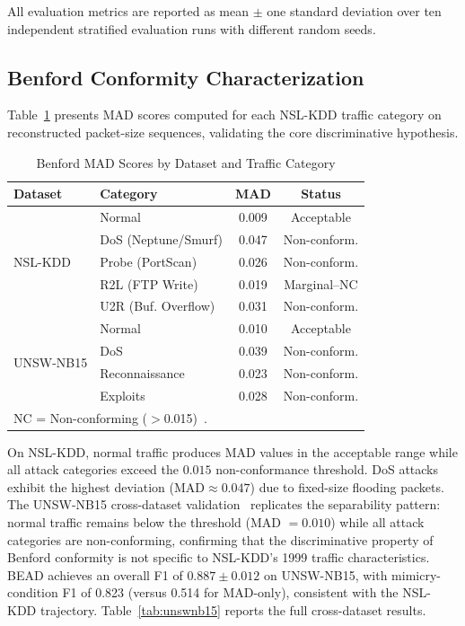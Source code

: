\documentclass[conference]{IEEEtran}
\begin{document}
All evaluation metrics are reported as mean $\pm$ one standard deviation
over ten independent stratified evaluation runs with different random seeds.

\subsection{Benford Conformity Characterization}

Table~\ref{tab:mad} presents MAD scores computed for each NSL-KDD traffic
category on reconstructed packet-size sequences, validating the core
discriminative hypothesis.

\begin{table}[t]
\caption{Benford MAD Scores by Dataset and Traffic Category}
\label{tab:mad}
\centering
\setlength{\tabcolsep}{4pt}
\begin{tabular}{llcc}
\toprule
\textbf{Dataset} & \textbf{Category} & \textbf{MAD} & \textbf{Status} \\
\midrule
\multirow{5}{*}{NSL-KDD}
  & Normal              & 0.009 & Acceptable     \\
  & DoS (Neptune/Smurf) & 0.047 & Non-conform.   \\
  & Probe (PortScan)    & 0.026 & Non-conform.   \\
  & R2L (FTP Write)     & 0.019 & Marginal--NC   \\
  & U2R (Buf. Overflow) & 0.031 & Non-conform.   \\
\midrule
\multirow{4}{*}{UNSW-NB15}
  & Normal              & 0.010 & Acceptable     \\
  & DoS                 & 0.039 & Non-conform.   \\
  & Reconnaissance      & 0.023 & Non-conform.   \\
  & Exploits            & 0.028 & Non-conform.   \\
\bottomrule
\multicolumn{4}{l}{\footnotesize NC = Non-conforming ($>$0.015)~\cite{b6}.}
\end{tabular}
\end{table}

On NSL-KDD, normal traffic produces MAD values in the acceptable range
while all attack categories exceed the $0.015$ non-conformance threshold.
DoS attacks exhibit the highest deviation ($\text{MAD} \approx 0.047$)
due to fixed-size flooding packets. The UNSW-NB15 cross-dataset
validation~\cite{b20} replicates the separability pattern: normal traffic
remains below the threshold (MAD $= 0.010$) while all attack categories
are non-conforming, confirming that the discriminative property of
Benford conformity is not specific to NSL-KDD's 1999 traffic
characteristics. BEAD achieves an overall F1 of $0.887\pm0.012$ on
UNSW-NB15, with mimicry-condition F1 of 0.823 (versus 0.514 for
MAD-only), consistent with the NSL-KDD trajectory.
Table~\ref{tab:unswnb15} reports the full cross-dataset results.
\end{document}
